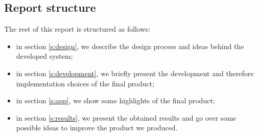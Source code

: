 \documentclass[../../main]{subfiles}
\begin{document}
\subsection{Report structure}
\label{ss:report-structure}

The rest of this report is structured as follows:
\begin{itemize}
    \item in section \ref{s:design}, we describe the design process and ideas behind the developed system;
    \item in section \ref{s:development}, we briefly present the development and therefore implementation choices of the final product;
    \item in section \ref{s:app}, we show some highlights of the final product;
    \item in section \ref{s:results}, we present the obtained results and go over some possible ideas to improve the product we produced.
\end{itemize}
\end{document}

